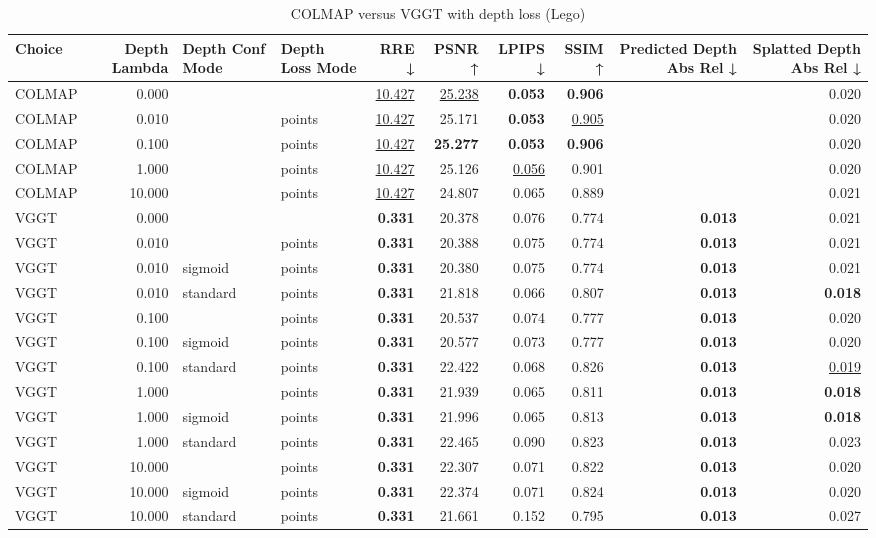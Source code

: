 \begin{table}[H]
\caption{COLMAP versus VGGT with depth loss (Lego)}
\label{tab:05_depth_lambda_lego}
\small
\begin{tabular}{lrllrrrrrr}
\toprule
Choice & Depth Lambda & Depth Conf Mode & Depth Loss Mode & RRE ↓ & PSNR ↑ & LPIPS ↓ & SSIM ↑ & Predicted Depth Abs Rel ↓ & Splatted Depth Abs Rel ↓ \\
\midrule
COLMAP & 0.000 &  &  & \underline{10.427} & \underline{25.238} & \textbf{0.053} & \textbf{0.906} &  & 0.020 \\
COLMAP & 0.010 &  & points & \underline{10.427} & 25.171 & \textbf{0.053} & \underline{0.905} &  & 0.020 \\
COLMAP & 0.100 &  & points & \underline{10.427} & \textbf{25.277} & \textbf{0.053} & \textbf{0.906} &  & 0.020 \\
COLMAP & 1.000 &  & points & \underline{10.427} & 25.126 & \underline{0.056} & 0.901 &  & 0.020 \\
COLMAP & 10.000 &  & points & \underline{10.427} & 24.807 & 0.065 & 0.889 &  & 0.021 \\
VGGT & 0.000 &  &  & \textbf{0.331} & 20.378 & 0.076 & 0.774 & \textbf{0.013} & 0.021 \\
VGGT & 0.010 &  & points & \textbf{0.331} & 20.388 & 0.075 & 0.774 & \textbf{0.013} & 0.021 \\
VGGT & 0.010 & sigmoid & points & \textbf{0.331} & 20.380 & 0.075 & 0.774 & \textbf{0.013} & 0.021 \\
VGGT & 0.010 & standard & points & \textbf{0.331} & 21.818 & 0.066 & 0.807 & \textbf{0.013} & \textbf{0.018} \\
VGGT & 0.100 &  & points & \textbf{0.331} & 20.537 & 0.074 & 0.777 & \textbf{0.013} & 0.020 \\
VGGT & 0.100 & sigmoid & points & \textbf{0.331} & 20.577 & 0.073 & 0.777 & \textbf{0.013} & 0.020 \\
VGGT & 0.100 & standard & points & \textbf{0.331} & 22.422 & 0.068 & 0.826 & \textbf{0.013} & \underline{0.019} \\
VGGT & 1.000 &  & points & \textbf{0.331} & 21.939 & 0.065 & 0.811 & \textbf{0.013} & \textbf{0.018} \\
VGGT & 1.000 & sigmoid & points & \textbf{0.331} & 21.996 & 0.065 & 0.813 & \textbf{0.013} & \textbf{0.018} \\
VGGT & 1.000 & standard & points & \textbf{0.331} & 22.465 & 0.090 & 0.823 & \textbf{0.013} & 0.023 \\
VGGT & 10.000 &  & points & \textbf{0.331} & 22.307 & 0.071 & 0.822 & \textbf{0.013} & 0.020 \\
VGGT & 10.000 & sigmoid & points & \textbf{0.331} & 22.374 & 0.071 & 0.824 & \textbf{0.013} & 0.020 \\
VGGT & 10.000 & standard & points & \textbf{0.331} & 21.661 & 0.152 & 0.795 & \textbf{0.013} & 0.027 \\
\bottomrule
\end{tabular}
\end{table}